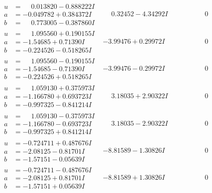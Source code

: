 \documentclass[1p]{elsarticle_modified}
\theoremstyle{definition}
\begin{document}
$$\begin{array}{c|c|c}
\begin{aligned}
u &= \phantom{-}0.013820 - 0.888222 I \\
a &= -0.049782 + 0.384372 I \\
b &= \phantom{-}0.773005 - 0.387860 I\end{aligned}
 & \phantom{-}0.32452 - 4.34292 I & \phantom{-0.000000 } 0 \\ \hline\begin{aligned}
u &= \phantom{-}1.095560 + 0.190155 I \\
a &= -1.54685 + 0.71390 I \\
b &= -0.224526 - 0.518265 I\end{aligned}
 & -3.99476 + 0.29972 I & \phantom{-0.000000 } 0 \\ \hline\begin{aligned}
u &= \phantom{-}1.095560 - 0.190155 I \\
a &= -1.54685 - 0.71390 I \\
b &= -0.224526 + 0.518265 I\end{aligned}
 & -3.99476 - 0.29972 I & \phantom{-0.000000 } 0 \\ \hline\begin{aligned}
u &= \phantom{-}1.059130 + 0.375973 I \\
a &= -1.166780 + 0.693723 I \\
b &= -0.997325 - 0.841214 I\end{aligned}
 & \phantom{-}3.18035 + 2.90322 I & \phantom{-0.000000 } 0 \\ \hline\begin{aligned}
u &= \phantom{-}1.059130 - 0.375973 I \\
a &= -1.166780 - 0.693723 I \\
b &= -0.997325 + 0.841214 I\end{aligned}
 & \phantom{-}3.18035 - 2.90322 I & \phantom{-0.000000 } 0 \\ \hline\begin{aligned}
u &= -0.724711 + 0.487676 I \\
a &= -2.08125 - 0.81701 I \\
b &= -1.57151 - 0.05639 I\end{aligned}
 & -8.81589 - 1.30826 I & \phantom{-0.000000 } 0 \\ \hline\begin{aligned}
u &= -0.724711 - 0.487676 I \\
a &= -2.08125 + 0.81701 I \\
b &= -1.57151 + 0.05639 I\end{aligned}
 & -8.81589 + 1.30826 I & \phantom{-0.000000 } 0 \\ \hline\begin{aligned}

\end{aligned}
\end{array}$$
\end{document}
